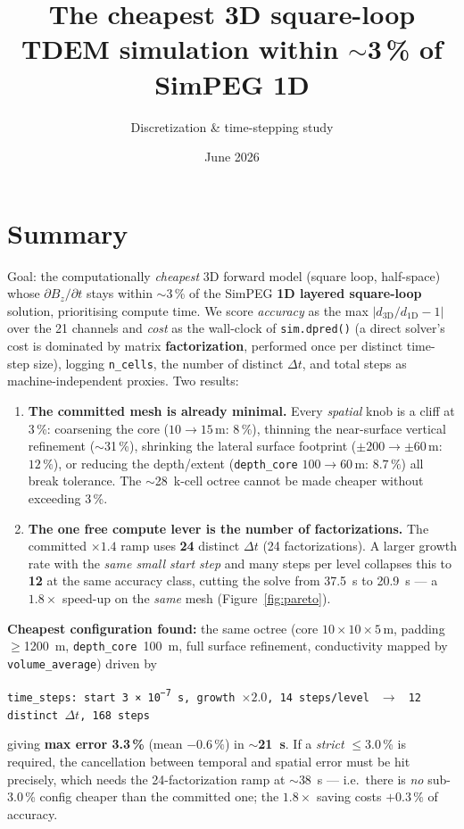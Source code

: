 \documentclass[11pt]{article}
\title{\vspace{-1.5em}\textbf{The cheapest 3D square-loop TDEM simulation within $\sim$3\,\% of SimPEG 1D}}
\author{Discretization \& time-stepping study}
\date{June 2026}
\newcommand{\dbdt}{\partial B_z/\partial t}
\begin{document}
\maketitle
\vspace{-1.5em}

\section*{Summary}
Goal: the computationally \emph{cheapest} 3D forward model (square loop, half-space) whose $\dbdt$ stays
within $\sim$3\,\% of the SimPEG \textbf{1D layered square-loop} solution, prioritising compute time. We
score \emph{accuracy} as the max $|d_\text{3D}/d_\text{1D}-1|$ over the 21 channels and \emph{cost} as the
wall-clock of \texttt{sim.dpred()} (a direct solver's cost is dominated by matrix \textbf{factorization},
performed once per distinct time-step size), logging \texttt{n\_cells}, the number of distinct $\Delta t$,
and total steps as machine-independent proxies. Two results:

\begin{enumerate}\setlength\itemsep{0.2em}
  \item \textbf{The committed mesh is already minimal.} Every \emph{spatial} knob is a cliff at 3\,\%:
  coarsening the core ($10\to15$\,m: $8\,\%$), thinning the near-surface vertical refinement
  ($\sim$31\,\%), shrinking the lateral surface footprint ($\pm200\to\pm60$\,m: $12\,\%$), or reducing
  the depth/extent (\texttt{depth\_core} $100\to60$\,m: $8.7\,\%$) all break tolerance. The
  $\sim$\SI{28}{k}-cell octree cannot be made cheaper without exceeding 3\,\%.
  \item \textbf{The one free compute lever is the number of factorizations.} The committed $\times1.4$
  ramp uses \textbf{24} distinct $\Delta t$ (24 factorizations). A larger growth rate with the \emph{same
  small start step} and many steps per level collapses this to \textbf{12} at the same accuracy class,
  cutting the solve from \SI{37.5}{s} to \SI{20.9}{s} --- a $\mathbf{1.8\times}$ speed-up on the
  \emph{same} mesh (Figure~\ref{fig:pareto}).
\end{enumerate}

\noindent\textbf{Cheapest configuration found:} the same octree (core $10\times10\times5$\,m,
padding $\geq$\SI{1200}{m}, \texttt{depth\_core}~\SI{100}{m}, full surface refinement, conductivity mapped
by \texttt{volume\_average}) driven by
\begin{center}\small
\texttt{time\_steps: start \SI{3e-7}{s}, growth $\times2.0$, 14 steps/level $\;\to\;$ 12 distinct $\Delta t$, 168 steps}
\end{center}
giving \textbf{max error 3.3\,\%} (mean $-0.6\,\%$) in \textbf{$\sim$\SI{21}{s}}. If a \emph{strict}
$\leq$3.0\,\% is required, the cancellation between temporal and spatial error must be hit precisely, which
needs the 24-factorization ramp at $\sim$\SI{38}{s} --- i.e.\ there is \emph{no} sub-3.0\,\% config cheaper
than the committed one; the $1.8\times$ saving costs $+0.3\,\%$ of accuracy.
\end{document}
